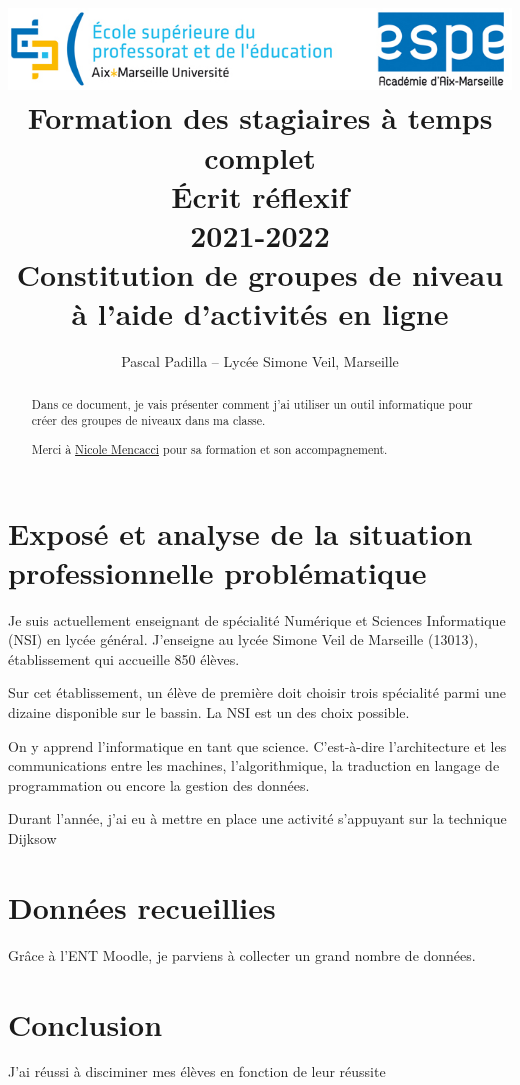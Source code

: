 \documentclass[a4paper, 12pt]{article}
\title{{\includegraphics[width=\linewidth]{espe}}\\[2cm]
Formation des stagiaires à temps complet\\[2cm]Écrit réflexif\\2021-2022 \\[4cm]
\textbf{Constitution de groupes de niveau à l'aide d'activités en ligne}\\[2cm]
}
\author{Pascal Padilla -- Lyc\'ee Simone Veil, Marseille \email{pascal.padilla@ax-aix-marseille.fr}}
\date{}
\begin{document}
\renewcommand{\labelitemi}{\textbullet}

\maketitle

\thispagestyle{empty}

\newpage
\begin{abstract}

Dans ce document, je vais présenter comment j'ai utiliser un outil informatique pour créer des groupes de niveaux dans ma classe. 

Merci à \href{nicole.mencacci@univ-amu.fr}{Nicole Mencacci} pour sa formation et son accompagnement.

\end{abstract}

\thispagestyle{empty}

\newpage
\tableofcontents

\thispagestyle{empty}

\newpage
%
%

\fancyhfoffset[L]{3cm}


\section{Exposé et analyse de la situation professionnelle problématique}

Je suis actuellement enseignant de spécialité Numérique et Sciences Informatique (NSI) en lycée général. J'enseigne au lycée Simone Veil de Marseille (13013), établissement qui accueille 850 élèves.


Sur cet établissement, un élève de première doit choisir trois spécialité parmi une dizaine disponible sur le bassin. La NSI est un des choix possible.

On y apprend l'informatique en tant que science. C'est-à-dire l'architecture et les communications entre les machines, l'algorithmique, la traduction en langage de programmation ou encore la gestion des données.


Durant l'année, j'ai eu à mettre en place une activité s'appuyant sur la technique Dijksow

\section{Données recueillies}

Grâce à l'ENT Moodle, je parviens à collecter un grand nombre de données.

\section{Conclusion}

J'ai réussi à disciminer mes élèves en fonction de leur réussite
\end{document}
